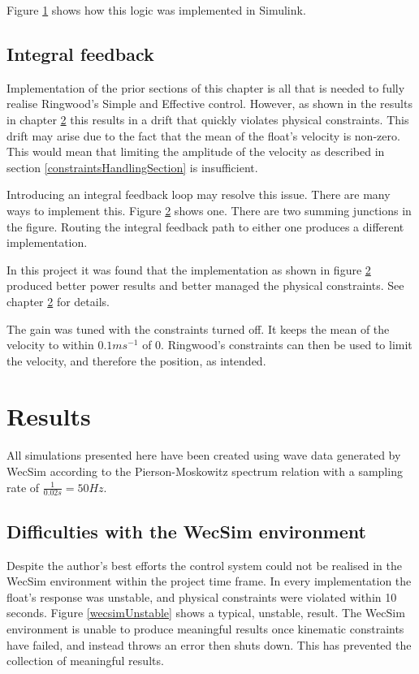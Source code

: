 \documentclass{report}
\begin{document}
Figure \ref{velocityConstraints} shows how this logic was implemented in Simulink.

\begin{figure}
\label{velocityConstraints}
\caption{}
\end{figure}


\section{Integral feedback}

Implementation of the prior sections of this chapter is all that is needed to fully realise Ringwood's Simple and Effective control. However, as shown in the results in chapter \ref{results} this results in a drift that quickly violates physical constraints. This drift may arise due to the fact that the mean of the float's velocity is non-zero. This would mean that limiting the amplitude of the velocity as described in section \ref{constraintsHandlingSection} is insufficient.

Introducing an integral feedback loop may resolve this issue. There are many ways to implement this. Figure \ref{integralFeedbackLoop} shows one. There are two summing junctions in the figure. Routing the integral feedback path to either one produces a different implementation. 

\begin{figure}
\label{integralFeedbackLoop}
\caption{}
\end{figure}

In this project it was found that the implementation as shown in figure \ref{integralFeedbackLoop} produced better power results and better managed the physical constraints. See chapter \ref{results} for details.

The gain was tuned with the constraints turned off. It keeps the mean of the velocity to within $0.1ms^{-1}$ of 0. Ringwood's constraints can then be used to limit the velocity, and therefore the position, as intended.

\chapter{Results}
\label{results}

All simulations presented here have been created using wave data generated by WecSim according to the Pierson-Moskowitz spectrum relation \cite{OGPM} with a sampling rate of $\frac{1}{0.02s}=50Hz$.


\section{Difficulties with the WecSim environment}
Despite the author's best efforts the control system could not be realised in the WecSim environment within the project time frame. In every implementation the float's response was unstable, and physical constraints were violated within 10 seconds. Figure \ref{wecsimUnstable} shows a typical, unstable, result. The WecSim environment is unable to produce meaningful results once kinematic constraints have failed, and instead throws an error then shuts down. This has prevented the collection of meaningful results.
\end{document}
